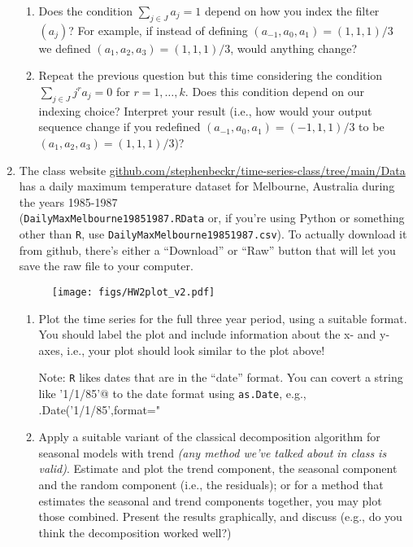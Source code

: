 \documentclass[10pt, letterpaper]{scrartcl}
\newcommand{\<}{\langle}  %
\renewcommand{\>}{\rangle}%
\newcommand{\RR}{\texttt{R}\xspace}
\begin{document}
\begin{enumerate}[align=left, leftmargin=*, label=\sffamily\bfseries Problem \arabic*:]
\begin{enumerate}
\item Does the condition $\sum_{j\in J} a_j=1$ depend on how you index the filter $(a_j)$?  For example, if instead of defining $(a_{-1},a_0,a_1) = (1,1,1)/3$ we defined $(a_{1},a_2,a_3) = (1,1,1)/3$, would anything change?


\item Repeat the previous question but this time considering the condition $\sum_{j\in J} j^ra_j=0$ for $r=1,\ldots,k$. Does this condition depend on our indexing choice?  Interpret your result (i.e., how would your output sequence change if you redefined $(a_{-1},a_0,a_1) = (-1,1,1)/3$ to be $(a_{1},a_2,a_3) = (1,1,1)/3$)?


\end{enumerate}


\item 
The class website \href{https://github.com/stephenbeckr/time-series-class/tree/main/Data}{github.com/stephenbeckr/time-series-class/tree/main/Data} has a daily maximum temperature dataset for Melbourne, Australia 
during the years 1985-1987 \\
(\texttt{DailyMaxMelbourne19851987.RData} 
or, if you're using Python or something other than \RR, use \texttt{DailyMaxMelbourne19851987.csv}).  To actually download it from github, there's either a ``Download'' or ``Raw'' button that will let you save the raw file to your computer.

\begin{figure}[h]
  \centering
  \texttt{[image: figs/HW2plot\_v2.pdf]}
\end{figure}

\begin{enumerate}
  \item
    Plot the time series for the full three year period, using a suitable format. You should label the plot and include information about the x- and y-axes, i.e., your plot should look similar to the plot above!
    
    Note: \RR likes dates that are in the ``date'' format. You can covert a string like \verb@'1/1/85'@ to the date format using \texttt{as.Date}, e.g.,  \verb@as.Date('1/1/85',format="%m/%d/%y")@
    
  \item
    Apply a suitable variant of the classical decomposition algorithm for 
    seasonal models with trend {\em(any method we've talked about in class is valid)}.  Estimate and plot the trend component, the seasonal component and the random component (i.e., the residuals);
    or for a method that estimates the seasonal and trend components together, you may plot those combined.  Present 
    the results graphically, and discuss (e.g., do you think the decomposition worked well?)



\end{enumerate}
\end{enumerate}
\end{document}
